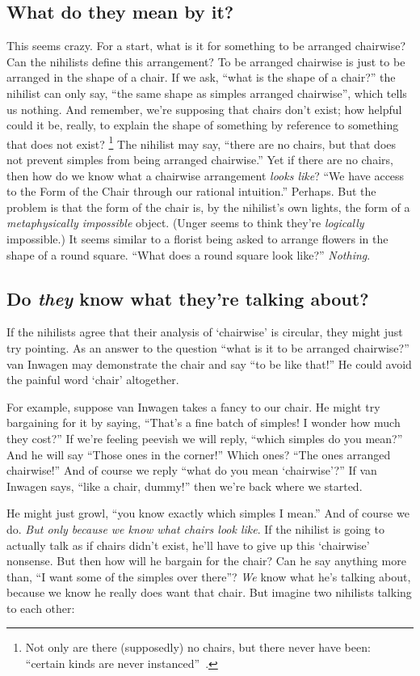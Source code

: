 \subsection{What do they mean by it?}
This seems crazy. For a start, what is it for something to be arranged chairwise? Can the nihilists define this arrangement? To be arranged chairwise is just to be arranged in the shape of a chair. If we ask, ``what is the shape of a chair?'' the nihilist can only say, ``the same shape as simples arranged chairwise'', which tells us nothing. And remember, we're supposing that chairs don't exist; how helpful could it be, really, to explain the shape of something by reference to something that does not exist?%
%
\footnote{Not only are there (supposedly) no chairs, but there never have been: ``certain kinds are never instanced''~\citep[147]{unger1979}.} %
%
The nihilist may say, ``there are no chairs, but that does not prevent simples from being arranged chairwise.'' Yet if there are no chairs, then how do we know what a chairwise arrangement {\em looks like}? ``We have access to the Form of the Chair through our rational intuition.'' Perhaps. But the problem is that the form of the chair is, by the nihilist's own lights, the form of a {\em metaphysically impossible} object. (Unger seems to think they're {\em logically} impossible.) It seems similar to a florist being asked to arrange flowers in the shape of a round square. ``What does a round square look like?'' {\em Nothing}.

\subsection{Do {\em they} know what they're talking about?}
If the nihilists agree that their analysis of `chairwise' is circular, they might just try pointing. As an answer to the question ``what is it to be arranged chairwise?'' van Inwagen may demonstrate the chair and say ``to be like that!'' He could avoid the painful word `chair' altogether.

For example, suppose van Inwagen takes a fancy to our chair. He might try bargaining for it by saying, ``That's a fine batch of simples! I wonder how much they cost?'' If we're feeling peevish we will reply, ``which simples do you mean?'' And he will say ``Those ones in the corner!'' Which ones? ``The ones arranged chairwise!'' And of course we reply ``what do you mean `chairwise'?'' If van Inwagen says, ``like a chair, dummy!'' then we're back where we started.

He might just growl, ``you know exactly which simples I mean.'' And of course we do. {\em But only because we know what chairs look like}. If the nihilist is going to actually talk as if chairs didn't exist, he'll have to give up this `chairwise' nonsense. But then how will he bargain for the chair? Can he say anything more than, ``I want some of the simples over there''? {\em We} know what he's talking about, because we know he really does want that chair. But imagine two nihilists talking to each other:

